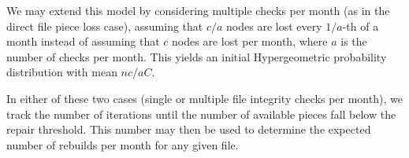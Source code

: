 We may extend this model by considering multiple checks per month (as in the direct file piece loss case), assuming that $c/a$ nodes are lost every $1/a$-th of a month instead of assuming that $c$ nodes are lost per month, where $a$ is the number of checks per month. This yields an initial Hypergeometric probability distribution with mean $nc/aC$.

In either of these two cases (single or multiple file integrity checks per month), we track the number of iterations until the number of available pieces fall below the repair threshold. This number may then be used to determine the expected number of rebuilds per month for any given file.